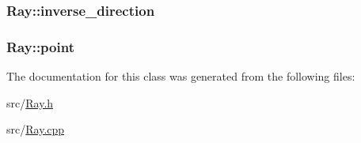 \subsubsection[{\texorpdfstring{inverse\+\_\+direction}{inverse_direction}}]{ Ray\+::inverse\+\_\+direction\hspace{0.3cm}{\ttfamily [private]}}\hypertarget{classRay_a58bfdb8ab63bad3882999e5d2113a927}{}\label{classRay_a58bfdb8ab63bad3882999e5d2113a927}
\subsubsection[{\texorpdfstring{point}{point}}]{ Ray\+::point\hspace{0.3cm}{\ttfamily [private]}}\hypertarget{classRay_a35cd5ddd116f79b927e5ce1dfaca64c7}{}\label{classRay_a35cd5ddd116f79b927e5ce1dfaca64c7}


The documentation for this class was generated from the following files\+:\begin{DoxyCompactItemize}
\item 
src/\hyperlink{Ray_8h}{Ray.\+h}\item 
src/\hyperlink{Ray_8cpp}{Ray.\+cpp}\end{DoxyCompactItemize}
